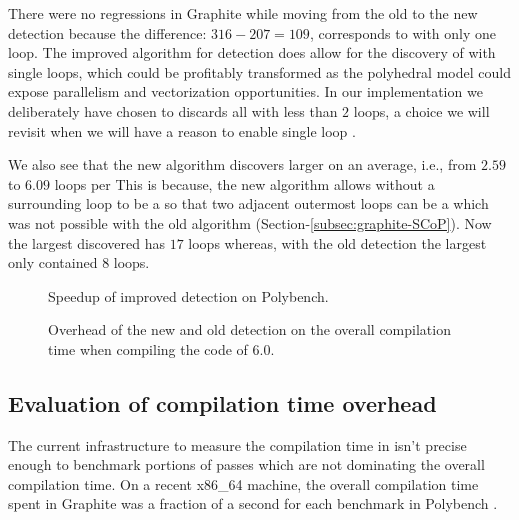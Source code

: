 \documentclass{sig-alternate}
\begin{document}
There were no regressions in Graphite while moving from the old to the new
\SCoP{} detection because the difference: $316 - 207 = 109$, corresponds to
 with only one loop.  The improved algorithm for \SCoP{} detection does
allow for the discovery of  with single loops, which could be profitably
transformed as the polyhedral model could expose parallelism and vectorization
opportunities.  In our implementation we deliberately have chosen to discards
all  with less than $2$ loops, a choice we will revisit when we will
have a reason to enable single loop .

We also see that the new algorithm discovers larger  on an average,
i.e., from $2.59$ to $6.09$ loops per  This is because, the new
algorithm allows \SESE{} without a surrounding loop to be a \SCoP{} so that two
adjacent outermost loops can be a \SCoP{,} which was not possible with the old algorithm
(Section-\ref{subsec:graphite-SCoP}). Now the largest \SCoP{} discovered has $17$
loops whereas, with the old \SCoP{} detection the largest \SCoP{} only contained $8$ loops.

\begin {figure}
  \begin{center}
    \resizebox{\linewidth}{!}{}
  \end{center}

  \vspace{-1em}

  \caption{Speedup of improved \SCoP{} detection on Polybench.}
  \label{fig:polybench-speedup}
\end {figure}

\begin {figure}
  \begin{center}
    \resizebox{\linewidth}{!}{}
  \end{center}

  \vspace{-1em}

  \caption{Overhead of the new and old \SCoP{} detection on the overall compilation
    time when compiling the code of \GCC{} 6.0.}
  \label{fig:gcc-speedup}
\end {figure}

\subsection{Evaluation of compilation time overhead}
The current infrastructure to measure the compilation time in \GCC{} isn't precise
enough to benchmark portions of passes which are not dominating the overall
compilation time.  On a recent x86\_64 machine, the overall compilation time
spent in Graphite was a fraction of a second for each benchmark
in Polybench \cite{polybench}.
\end{document}

